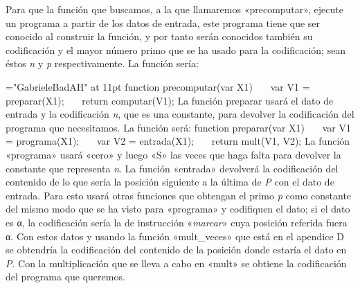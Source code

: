 Para que la función que buscamos, a la que llamaremos «{\fgabrielen precomputar}», ejecute un
programa a partir de los datos de entrada, este programa tiene que ser conocido al construir la
función, y por tanto serán conocidos también su codificación y el mayor número primo que se ha
usado para la codificación; sean éstos {\it n} y {\it p} respectivamente. La función sería:

\font\fgabrielen="GabrieleBadAH" at 11pt
\cachosrec
function precomputar(var X1)
~~~var V1 = preparar(X1);
~~~return computar(V1);
\fincachos
La función preparar usará el dato de entrada y la codificación {\it n}, que es una constante, para
devolver la codificación del programa que necesitamos. La función será:
\cachosrec
function preparar(var X1)
~~~var V1 = programa(X1);
~~~var V2 = entrada(X1);
~~~return mult(V1, V2);
\fincachos
La función «{\fgabrielen programa}» usará «{\fgabrielen cero}» y luego «{\fgabrielen S}» las veces
que haga falta para devolver la constante que representa {\it n}. La función «{\fgabrielen entrada}»
devolverá la codificación del contenido de lo que sería la posición siguiente a la última de {\it P}
con el dato de entrada. Para esto usará otras funciones que obtengan el primo {\it p} como constante
del mismo modo que se ha visto para «{\fgabrielen programa}» y codifiquen el dato; si el dato es α,
la codificación sería la de instrucción «{\it marcar}» cuya posición referida fuera α. Con estos
datos y usando la función «{\fgabrielen mult\_veces}» que está en el apendice D se obtendría la
codificación del contenido de la posición donde estaría el dato en {\it P}. Con la multiplicación
que se lleva a cabo en «{\fgabrielen mult}» se obtiene la codificación del programa que queremos.

